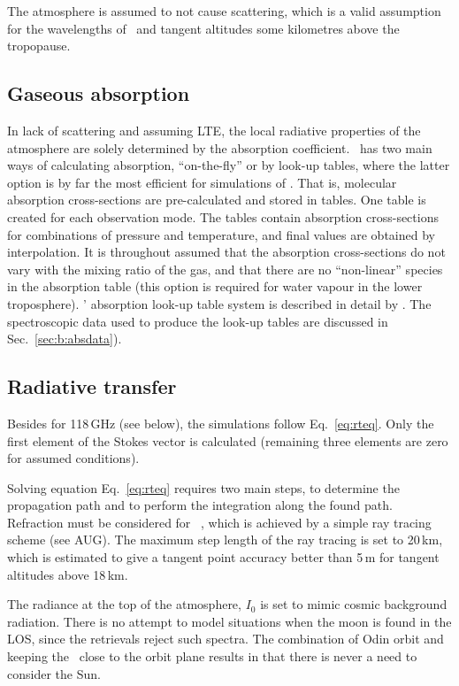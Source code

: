 The atmosphere is assumed to not cause scattering, which is a valid assumption
for the wavelengths of \smr\ and tangent altitudes some kilometres above the
tropopause. 


\subsection{Gaseous absorption}
%
In lack of scattering and assuming LTE, the local radiative properties of the
atmosphere are solely determined by the absorption coefficient. \ARTS\ has two
main ways of calculating absorption, ``on-the-fly'' or by look-up tables, where
the latter option is by far the most efficient for simulations of \smr. That
is, molecular absorption cross-sections are pre-calculated and stored in
tables. One table is created for each observation mode. The tables contain
absorption cross-sections for combinations of pressure and temperature, and
final values are obtained by interpolation. It is throughout assumed that the
absorption cross-sections do not vary with the mixing ratio of the gas, and that
there are no ``non-linear'' species in the absorption table (this option is
required for water vapour in the lower troposphere).
\ARTS' absorption look-up table system is described in detail by
\citet{buehler:absor:11}. The spectroscopic data used to produce the look-up
tables are discussed in Sec.~\ref{sec:b:absdata}).


\subsection{Radiative transfer}
%
Besides for 118\,GHz (see below), the simulations follow Eq.~\ref{eq:rteq}. Only
the first element of the Stokes vector is calculated (remaining three elements
are zero for assumed conditions).

Solving equation Eq.~\ref{eq:rteq} requires two main steps, to determine the
propagation path and to perform the integration along the found path.
Refraction must be considered for \smr\ \citep{eriksson:studi:02}, which is
achieved by a simple ray tracing scheme (see AUG). The maximum step length of
the ray tracing is set to 20\,km, which is estimated to give a
tangent point accuracy better than 5\,m for tangent altitudes
above 18\,km.

The radiance at the top of the atmosphere, $I_0$ is set to mimic cosmic
background radiation. There is no attempt to model situations when the moon is
found in the LOS, since the retrievals reject such spectra. The combination of Odin
orbit and keeping the \LOS\ close to the orbit plane results in that there is
never a need to consider the Sun.




